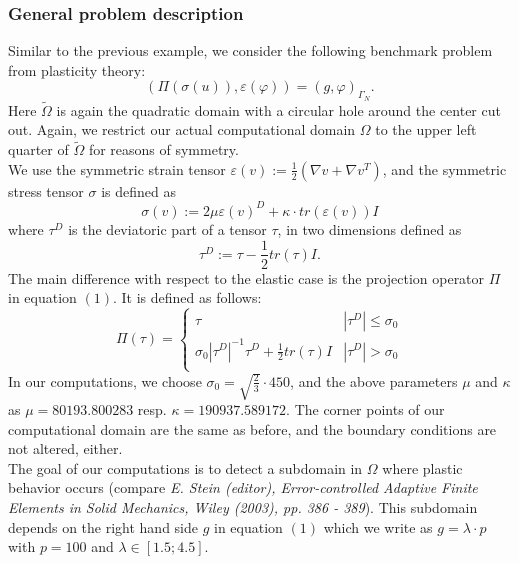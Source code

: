 \subsubsection{General problem description}

Similar to the previous example, we consider the following benchmark problem from plasticity theory:
\begin{equation}
   (\Pi(\sigma(u)),\varepsilon(\varphi)) = (g,\varphi)_{\Gamma_N}.
\end{equation}
Here $\tilde{\Omega}$ is again the quadratic domain with a circular hole around the center cut out. Again, we restrict our actual computational domain $\Omega$ to the upper left quarter of $\tilde{\Omega}$ for reasons of symmetry.\\
We use the symmetric strain tensor $\varepsilon(v) := \frac{1}{2}(\nabla v + \nabla v^T)$, and the symmetric stress tensor $\sigma$ is defined as
\begin{equation*}
   \sigma(v) := 2\mu \varepsilon(v)^D + \kappa \cdot tr (\varepsilon(v)) I
\end{equation*}
where $\tau^D$ is the deviatoric part of a tensor $\tau$, in two dimensions defined as
\begin{equation*}
   \tau^D := \tau - \frac{1}{2} tr(\tau) I.
\end{equation*}
The main difference with respect to the elastic case is the projection operator $\Pi$ in equation $(1)$. It is defined as follows:
\begin{equation*}
\Pi(\tau) = \left\{
            \begin{array}{lr}
            \tau & |\tau^D| \leq \sigma_0\\
            \sigma_0 |\tau^D|^{-1} \tau^D + \frac{1}{2} tr(\tau) I & |\tau^D| > \sigma_0\\ 
            \end{array}
            \right. 
\end{equation*}
In our computations, we choose $\sigma_0 = \sqrt{\frac{2}{3}}\cdot 450$, and the above parameters $\mu$ and $\kappa$ as $\mu = 80193.800283$ resp. $\kappa = 190937.589172$. The corner points of our computational domain are the same as before, and the boundary conditions are not altered, either.\\
The goal of our computations is to detect a subdomain in $\Omega$ where plastic behavior occurs (compare \textit{E. Stein (editor), Error-controlled Adaptive Finite Elements in Solid Mechanics, Wiley (2003), pp. 386 - 389}). This subdomain depends on the right hand side $g$ in equation $(1)$ which we write as $g = \lambda \cdot p$ with $p = 100$ and $\lambda \in [1.5;4.5]$.\\

